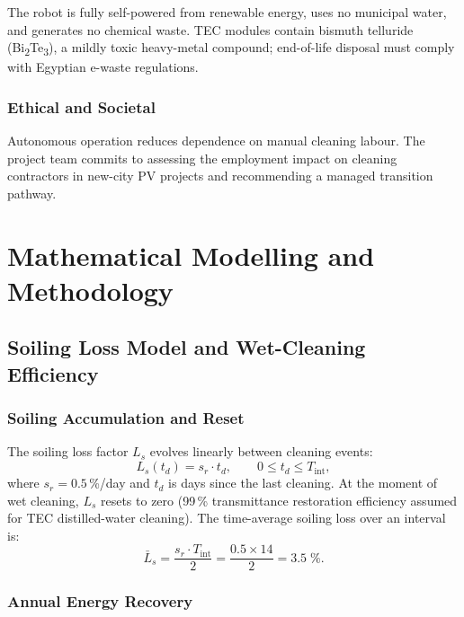 \documentclass[12pt,a4paper]{report}
\numberwithin{equation}{chapter}
\numberwithin{figure}{chapter}
\numberwithin{table}{chapter}
\begin{document}
The robot is fully self-powered from renewable energy, uses no municipal water, and
generates no chemical waste. TEC modules contain bismuth telluride
(Bi\textsubscript{2}Te\textsubscript{3}), a mildly toxic heavy-metal compound;
end-of-life disposal must comply with Egyptian e-waste regulations.

\subsection{Ethical and Societal}

Autonomous operation reduces dependence on manual cleaning labour. The project
team commits to assessing the employment impact on cleaning contractors in new-city
PV projects and recommending a managed transition pathway.

\chapter{Mathematical Modelling and Methodology}

\section{Soiling Loss Model and Wet-Cleaning Efficiency}

\subsection{Soiling Accumulation and Reset}

The soiling loss factor $L_s$ evolves linearly between cleaning events:
\begin{equation}
  L_s(t_d) = s_r \cdot t_d, \qquad 0 \leq t_d \leq T_\mathrm{int},
  \label{eq:6.1}
\end{equation}
where $s_r = 0.5$\,\%/day and $t_d$ is days since the last cleaning. At the moment of
wet cleaning, $L_s$ resets to zero (99\,\% transmittance restoration efficiency assumed
for TEC distilled-water cleaning). The time-average soiling loss over an interval is:
\begin{equation}
  \bar{L}_s = \frac{s_r \cdot T_\mathrm{int}}{2} = \frac{0.5 \times 14}{2} = 3.5\;\%.
  \label{eq:6.2}
\end{equation}

\subsection{Annual Energy Recovery}
\end{document}
